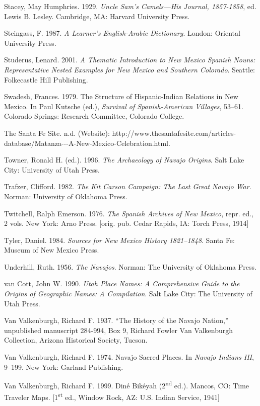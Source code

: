 \begin{hang}
	Stacey, May Humphries. 1929.  \textit{Uncle Sam’s Camels—His Journal, 1857-1858}, ed. Lewis B. Lesley.  Cambridge, MA:  Harvard University Press.

	Steingass, F.  1987.  \textit{A Learner’s English-Arabic Dictionary}.  London:  Oriental University Press.

	Studerus, Lenard. 2001.  \textit{A Thematic Introduction to New Mexico Spanish Nouns: Representative Nested Examples for New Mexico and Southern Colorado}.  Seattle:  Folkecastle Hill Publishing.

	Swadesh, Frances. 1979.  The Structure of Hispanic-Indian Relations in New Mexico.  In Paul Kutsche (ed.), \textit{Survival of Spanish-American Villages}, 53--61.  Colorado Springs:  Research Committee, Colorado College.

	The Santa Fe Site. n.d.  (Website): http://www.thesantafesite.com/articles-database/Matanza-{}-{}-A-New-Mexico-Celebration.html.

	Towner, Ronald H. (ed.). 1996. \textit{The Archaeology of Navajo Origins}.  Salt Lake City:  University of Utah Press.

	Trafzer, Clifford. 1982.  \textit{The Kit Carson Campaign: The Last Great Navajo War}.  Norman:  University of Oklahoma Press.

	Twitchell, Ralph Emerson. 1976.  \textit{The Spanish Archives of New Mexico}, repr. ed., 2 vols.  New York:  Arno Press.  [orig. pub. Cedar Rapids, IA:  Torch Press, 1914]

	Tyler, Daniel. 1984.  \textit{Sources for New Mexico History 1821--1848}.  Santa Fe:  Museum of New Mexico Press.

	Underhill, Ruth. 1956.  \textit{The Navajos}.  Norman:  The University of Oklahoma Press.

	van Cott, John W.  1990. \textit{Utah Place Names: A Comprehensive Guide to the Origins of Geographic Names: A Compilation}.  Salt Lake City:  The University of Utah Press.

	Van Valkenburgh, Richard F.  1937.  “The History of the Navajo Nation,” unpublished manuscript 284-994, Box 9, Richard Fowler Van Valkenburgh Collection, Arizona Historical Society, Tucson.

	Van Valkenburgh, Richard F.  1974.  Navajo Sacred Places.  In \textit{Navajo Indians III}, 9--199.  New York:  Garland Publishing.

	Van Valkenburgh, Richard F.  1999.  Diné Bikéyah (2\textsuperscript{nd} ed.).  Mancos, CO:  Time Traveler Maps.  [1\textsuperscript{st} ed., Window Rock, AZ:  U.S. Indian Service, 1941]


\end{hang}
